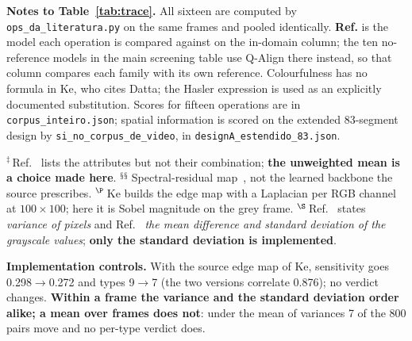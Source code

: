 \noindent\begin{minipage}{\linewidth}\scriptsize\textbf{Notes to Table~\ref{tab:trace}.} All sixteen are computed by \texttt{ops\_da\_literatura.py} on the same frames and pooled identically. \textbf{Ref.} is the model each operation is compared against on the in-domain column; the ten no-reference models in the main screening table use Q-Align there instead, so that column compares each family with its own reference. Colourfulness has no formula in Ke, who cites Datta; the Hasler expression is used as an explicitly documented substitution. Scores for fifteen operations are in \texttt{corpus\_inteiro.json}; spatial information is scored on the extended 83-segment design by \texttt{si\_no\_corpus\_de\_video}, in \texttt{designA\_estendido\_83.json}.\par\smallskip
$^{\ddagger}$\,Ref.~\citep{gygli2014summe} lists the attributes but not their combination; \textbf{the unweighted mean is a choice made here}. $^{\mathsection\mathsection}$\,Spectral-residual map~\citep{hou2007spectral}, not the learned backbone the source prescribes. $^{\P}$\,Ke builds the edge map with a Laplacian per RGB channel at $100\times100$; here it is Sobel magnitude on the grey frame. $^{\S}$\,Ref.~\citep{jeong2016static} states \emph{variance of pixels} and Ref.~\citep{xu2024property} \emph{the mean difference and standard deviation of the grayscale values}; \textbf{only the standard deviation is implemented}.\end{minipage}\par\medskip

\noindent\begin{minipage}{\linewidth}\scriptsize \textbf{Implementation controls.} With the source edge map of Ke, sensitivity goes 0.298$\to$0.272 and types 9$\to$7 (the two versions correlate 0.876); no verdict changes. \textbf{Within a frame the variance and the standard deviation order alike; a mean over frames does not}: under the mean of variances 7 of the 800 pairs move and no per-type verdict does.\end{minipage}\par\medskip
